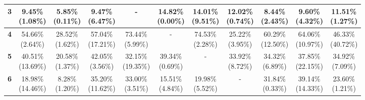 \documentclass{report}
\begin{document}
\begin{center}
{\begin{tabular}{|c|c|c|c|c|c|c|c|c|c|c|}
\textbf{3} & \makecell{9.45\% \\ (1.08\%)} & \makecell{5.85\% \\ (0.11\%)} & \makecell{9.47\% \\ (6.47\%)} & - & \makecell{14.82\% \\ (0.00\%)} & \makecell{14.01\% \\ (9.51\%)} & \makecell{12.02\% \\ (0.74\%)} & \makecell{8.44\% \\ (2.43\%)} & \makecell{9.60\% \\ (4.32\%)} & \makecell{11.51\% \\ (1.27\%)} \\ \hline
\textbf{4} & \makecell{54.66\% \\ (2.64\%)} & \makecell{28.52\% \\ (1.62\%)} & \makecell{57.04\% \\ (17.21\%)} & \makecell{73.44\% \\ (5.99\%)} & - & \makecell{74.53\% \\ (2.28\%)} & \makecell{25.22\% \\ (3.95\%)} & \makecell{60.29\% \\ (12.50\%)} & \makecell{64.06\% \\ (10.97\%)} & \makecell{46.33\% \\ (40.72\%)} \\ \hline
\textbf{5} & \makecell{40.51\% \\ (13.69\%)} & \makecell{20.58\% \\ (1.37\%)} & \makecell{42.05\% \\ (3.56\%)} & \makecell{32.15\% \\ (19.35\%)} & \makecell{39.34\% \\ (0.69\%)} & - & \makecell{33.92\% \\ (8.72\%)} & \makecell{34.32\% \\ (6.89\%)} & \makecell{37.85\% \\ (22.15\%)} & \makecell{34.92\% \\ (7.09\%)} \\ \hline
\textbf{6} & \makecell{18.98\% \\ (14.46\%)} & \makecell{8.28\% \\ (1.20\%)} & \makecell{35.20\% \\ (11.62\%)} & \makecell{33.00\% \\ (3.51\%)} & \makecell{15.51\% \\ (4.84\%)} & \makecell{19.98\% \\ (5.52\%)} & - & \makecell{31.84\% \\ (0.33\%)} & \makecell{39.14\% \\ (14.33\%)} & \makecell{23.60\% \\ (1.21\%)} \\ \hline

\end{tabular}}
\end{center}
\end{document}
